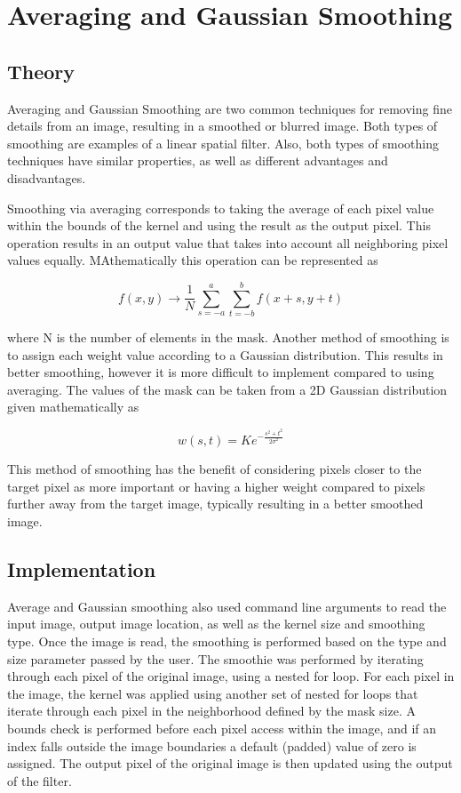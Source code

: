 \documentclass[headings=optiontoheadandtoc,listof=totoc,parskip=full]{scrartcl}
\begin{document}
\section{Averaging and Gaussian Smoothing}
\label{sec:smoothing}

\subsection{Theory}

Averaging and Gaussian Smoothing are two common techniques for removing fine details from an image, resulting in a smoothed or blurred image. Both types of smoothing are examples of a linear spatial filter. Also, both types of smoothing techniques have similar properties, as well as different advantages and disadvantages. 

Smoothing via averaging corresponds to taking the average of each pixel value within the bounds of the kernel and using the result as the output pixel. This operation results in an output value that takes into account all neighboring pixel values equally. MAthematically this operation can be represented as

\[f(x, y) \rightarrow \frac{1}{N} \sum_{s=-a}^a \sum_{t=-b}^b f(x+s, y+t)\]

where N is the number of elements in the mask. Another method of smoothing is to assign each weight value according to a Gaussian distribution. This results in better smoothing, however it is more difficult to implement compared to using averaging. The values of the mask can be taken from a 2D Gaussian distribution given mathematically as 

\[w(s, t) = K e^{-\frac{s^2+t^2}{2\sigma^2}}\]

This method of smoothing has the benefit of considering pixels closer to the target pixel as more important or having a higher weight compared to pixels further away from the target image, typically resulting in a better smoothed image.


\subsection{Implementation}

Average and Gaussian smoothing also used command line arguments to read the input image, output image location, as well as the kernel size and smoothing type. Once the image is read, the smoothing is performed based on the type and size parameter passed by the user. The smoothie was performed by iterating through each pixel of the original image, using a nested for loop. For each pixel in the image, the kernel was applied using another set of nested for loops that iterate through each pixel in the neighborhood defined by the mask size. A bounds check is performed before each pixel access within the image, and if an index falls outside the image boundaries a default (padded) value of zero is assigned. The output pixel of the original image is then updated using the output of the filter.
\end{document}
